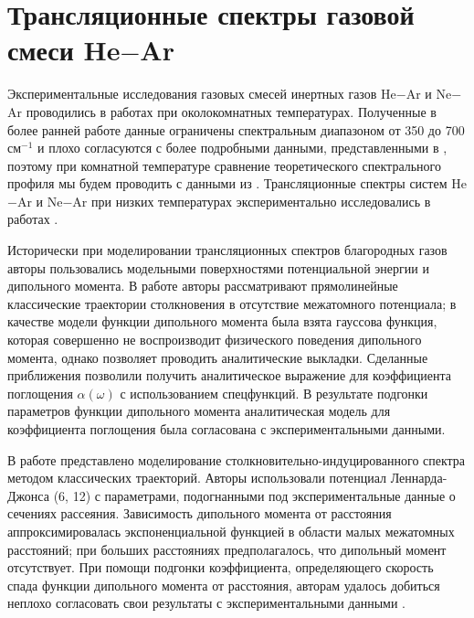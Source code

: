 \section{Трансляционные спектры газовой смеси He$-$Ar}

Экспериментальные исследования газовых смесей инертных газов He$-$Ar и Ne$-$Ar проводились в работах \cite{bosomworth1965_part1, bosomworth1965_part2} при околокомнатных температурах. Полученные в более ранней работе \cite{kiss1959} данные ограничены спектральным диапазоном от 350 до 700 см$^{-1}$ и плохо согласуются с более подробными данными, представленными в \cite{bosomworth1965_part2}, поэтому при комнатной температуре сравнение теоретического спектрального профиля мы будем проводить с данными из \cite{bosomworth1965_part2}. Трансляционные спектры систем He$-$Ar и Ne$-$Ar при низких температурах экспериментально исследовались в работах \cite{bukhtoyarova1977, bukhtoyarova1977_2, ryzhov1974}. \par 
Исторически при моделировании трансляционных спектров благородных газов авторы пользовались модельными поверхностями потенциальной энергии и дипольного момента. В работе \cite{levine1967} авторы рассматривают прямолинейные классические траектории столкновения в отсутствие межатомного потенциала; в качестве модели функции дипольного момента была взята гауссова функция, которая совершенно не воспроизводит физического поведения дипольного момента, однако позволяет проводить аналитические выкладки. Сделанные приближения позволили получить аналитическое выражение для коэффициента поглощения $\alpha(\omega)$ с использованием спецфункций. В результате подгонки параметров функции дипольного момента аналитическая модель для коэффициента поглощения была согласована с экспериментальными данными. \par
В работе \cite{mcquarrie1968} представлено моделирование столкновительно-индуцированного спектра методом классических траекторий. Авторы использовали потенциал Леннарда-Джонса (6, 12) с параметрами, подогнанными под экспериментальные данные о сечениях рассеяния. Зависимость дипольного момента от расстояния аппроксимировалась экспоненциальной функцией в области малых межатомных расстояний; при больших расстояниях предполагалось, что дипольный момент отсутствует. При помощи подгонки коэффициента, определяющего скорость спада функции дипольного момента от расстояния, авторам удалось добиться неплохо согласовать свои результаты с экспериментальными данными \cite{bosomworth1965_part2}. \par
